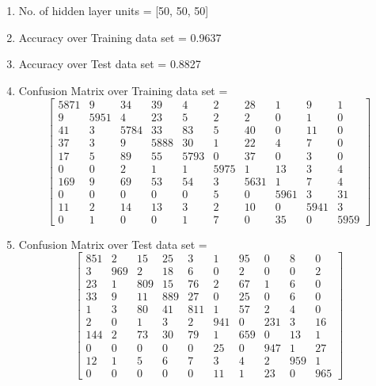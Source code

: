 \documentclass[11pt]{article}
\begin{document}
\begin{enumerate}
\item No. of hidden layer units = [50, 50, 50]
\item Accuracy over Training data set = 0.9637
\item Accuracy over Test data set = 0.8827
\item Confusion Matrix over Training data set = 
\begin{equation}
  \begin{bmatrix}
5871 & 9 & 34 & 39 & 4 & 2 & 28 & 1 & 9 & 1\\
9 & 5951 & 4 & 23 & 5 & 2 & 2 & 0 & 1 & 0\\
41 & 3 & 5784 & 33 & 83 & 5 & 40 & 0 & 11 & 0\\
37 & 3 & 9 & 5888 & 30 & 1 & 22 & 4 & 7 & 0\\
17 & 5 & 89 & 55 & 5793 & 0 & 37 & 0 & 3 & 0\\
0 & 0 & 2 & 1 & 1 & 5975 & 1 & 13 & 3 & 4\\
169 & 9 & 69 & 53 & 54 & 3 & 5631 & 1 & 7 & 4\\
0 & 0 & 0 & 0 & 0 & 5 & 0 & 5961 & 3 & 31\\
11 & 2 & 14 & 13 & 3 & 2 & 10 & 0 & 5941 & 3\\
0 & 1 & 0 & 0 & 1 & 7 & 0 & 35 & 0 & 5959
  \end{bmatrix}
\end{equation}
\item Confusion Matrix over Test data set = 
\begin{equation}
  \begin{bmatrix}
851 & 2 & 15 & 25 & 3 & 1 & 95 & 0 & 8 & 0\\
3 & 969 & 2 & 18 & 6 & 0 & 2 & 0 & 0 & 2\\
23 & 1 & 809 & 15 & 76 & 2 & 67 & 1 & 6 & 0\\
33 & 9 & 11 & 889 & 27 & 0 & 25 & 0 & 6 & 0\\
1 & 3 & 80 & 41 & 811 & 1 & 57 & 2 & 4 & 0\\
2 & 0 & 1 & 3 & 2 & 941 & 0 & 231 & 3 & 16\\
144 & 2 & 73 & 30 & 79 & 1 & 659 & 0 & 13 & 1\\
0 & 0 & 0 & 0 & 0 & 25 & 0 & 947 & 1 & 27\\
12 & 1 & 5 & 6 & 7 & 3 & 4 & 2 & 959 & 1\\
0 & 0 & 0 & 0 & 0 & 11 & 1 & 23 & 0 & 965
  \end{bmatrix}
\end{equation}
\end{enumerate}
\end{document}
